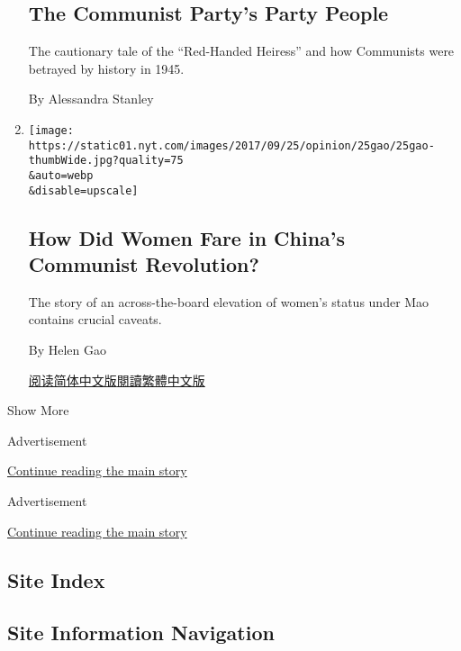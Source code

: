 \begin{enumerate}
  \hypertarget{the-communist-partys-party-people}{%
  \subsection{The Communist Party's Party
  People}\label{the-communist-partys-party-people}}

  The cautionary tale of the ``Red-Handed Heiress'' and how Communists
  were betrayed by history in 1945.

  By Alessandra Stanley
\item
  \href{/2017/09/25/opinion/women-china-communist-revolution.html}{}

  \texttt{[image: https://static01.nyt.com/images/2017/09/25/opinion/25gao/25gao-thumbWide.jpg?quality=75\\\&auto=webp\\\&disable=upscale]}

  \hypertarget{how-did-women-fare-in-chinas-communist-revolution}{%
  \subsection{How Did Women Fare in China's Communist
  Revolution?}\label{how-did-women-fare-in-chinas-communist-revolution}}

  The story of an across-the-board elevation of women's status under Mao
  contains crucial caveats.

  By Helen Gao

  \href{https://cn.nytimes.com/opinion/20170926/women-china-communist-revolution/}{阅读简体中文版}\href{https://cn.nytimes.com/opinion/20170926/women-china-communist-revolution/zh-hant/}{閱讀繁體中文版}
\end{enumerate}

Show More

Advertisement

\protect\hyperlink{after-mid1}{Continue reading the main story}

Advertisement

\protect\hyperlink{after-mktg}{Continue reading the main story}

\hypertarget{site-index}{%
\subsection{Site Index}\label{site-index}}

\hypertarget{site-information-navigation}{%
\subsection{Site Information
Navigation}\label{site-information-navigation}}

